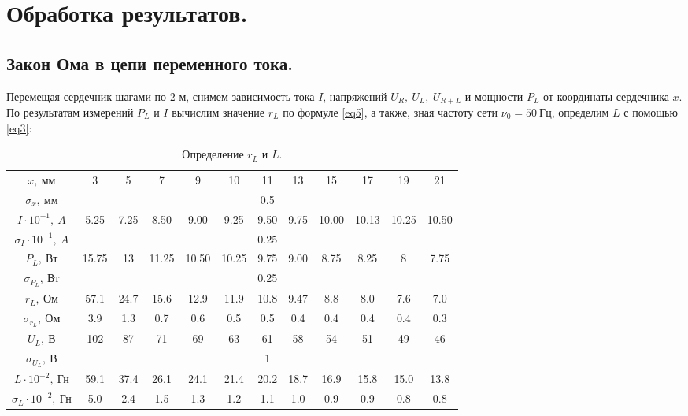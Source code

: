 \documentclass[a4paper, 12pt, twoside]{article}
\begin{document}
\newpage
\section{Обработка результатов.}
\subsection{Закон Ома в цепи переменного тока.}

Перемещая сердечник шагами по $2$ м, снимем зависимость тока $I$, напряжений $U_R,~U_L,~U_{R+L}$ и мощности $P_L$ от координаты сердечника $x$. По результатам измерений $P_L$ и $I$ вычислим значение $r_L$ по формуле \eqref{eq5}, а также, зная частоту сети $\nu_0 = 50~\text{Гц}$, определим $L$ с помощью \eqref{eq3}:

\begin{table}[H]
	\centering
	\caption{Определение $r_L$ и $L$.}
	\label{t1}
	\begin{tabular}{c|ccccccccccc} \toprule
		$x,~\text{мм}$           & 3  & 5 & 7  & 9  & 10  & 11 & 13 & 15   & 17   & 19 & 21 \\
		$\sigma_{x},~\text{мм}$ & \multicolumn{11}{c}{0.5}                                                        \\ \midrule
		$I \cdot 10^{-1},~A$           & 5.25  & 7.25 & 8.50  & 9.00  & 9.25  & 9.50 & 9.75 & 10.00   & 10.13   & 10.25 & 10.50 \\
		$\sigma_{I}\cdot 10^{-1},~A$ & \multicolumn{11}{c}{0.25}                                                        \\ \midrule
		$P_L,~\text{Вт}$                & 15.75 & 13   & 11.25 & 10.50 & 10.25 & 9.75 & 9.00 & 8.75 & 8.25 & 8     & 7.75  \\
		$\sigma_{P_L},~\text{Вт}$      & \multicolumn{11}{c}{0.25}   \\ \midrule
		$r_L,~\text{Ом}$                & 57.1 & 24.7   & 15.6 & 12.9 & 11.9 & 10.8 & 9.47 & 8.8 & 8.0 & 7.6     & 7.0 \\ 
		$\sigma_{r_L},~\text{Ом}$      &3.9 &1.3&0.7&0.6&0.5&0.5&0.4&0.4&0.4&0.4&0.3 \\ \midrule
		$U_L,~\text{В}$                & 102 & 87   & 71 & 69 & 63 & 61 & 58 & 54 & 51 & 49 & 46 \\ 
		$\sigma_{U_L},~\text{В}$      & \multicolumn{11}{c}{1} \\ \midrule
		$L\cdot 10^{-2},~\text{Гн}$                & 59.1 &37.4    & 26.1 & 24.1 & 21.4 & 20.2 & 18.7 & 16.9 & 15.8 & 15.0     & 13.8 \\ 
		$\sigma_{L}\cdot 10^{-2},~\text{Гн}$      &5.0 &2.4  &1.5  &1.3  &1.2  &1.1  &1.0  &0.9  &0.9  &0.8  &0.8 \\ \bottomrule                                                    
	\end{tabular}
\end{table}
\end{document}
